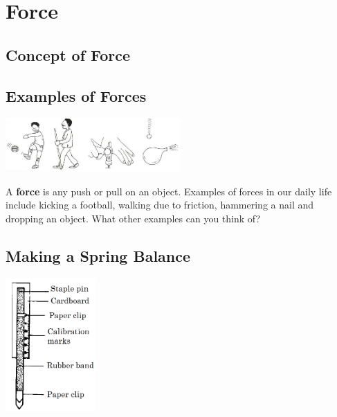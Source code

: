 \section{Force} 

\begin{multicols}{2}

\section*{Concept of Force}


\subsection{Examples of Forces}
\begin{center}
\includegraphics[width=0.5\textwidth]{./img/vso/forces-ex.jpg}
\end{center}

A \textbf{force} is any push or pull on an object. Examples of forces in our daily life include kicking a football, walking due to friction, hammering a nail and dropping an object. What other examples can you think of?

\subsection{Making a Spring Balance} 

\begin{center}
\includegraphics[width=0.26\textwidth]{./img/source/spring-balance.png}
\end{center}


\end{multicols}

